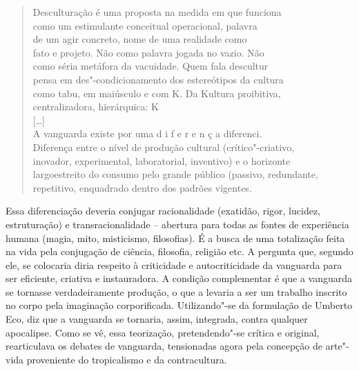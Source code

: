 \begin{quote}
Desculturação é uma proposta na medida em que \qb{}funciona\\
como um estimulante conceitual operacional, palavra\\
de um agir concreto, nome de uma realidade como\\
fato e projeto. Não como palavra jogada no vazio. Não\\
como séria metáfora da vacuidade. Quem fala \qb{}descultur\\
pensa em des"-condicionamento dos estereótipos da \qb{}cultura\\
como tabu, em maiúsculo e com K. Da Kultura \qb{}proibitiva,\\
centralizadora, hierárquica: K\\
{[}\ldots{}{]}\\
A vanguarda existe por uma d i f e r e n ç a \qb{}diferenci.\\
Diferença entre o nível de produção cultural \qb{}(crítico"-criativo,\\
inovador, experimental, laboratorial, inventivo) e o \qb{}horizonte\\
largoestreito do consumo pelo grande público (passivo, \qb{}redundante,\\
repetitivo, enquadrado dentro dos padrões vigentes.
\end{quote}

Essa diferenciação deveria conjugar racionalidade (exatidão, rigor,
lucidez, estruturação) e transracionalidade -- abertura para todas as
fontes de experiência humana (magia, mito, misticismo, filosofias). É a
busca de uma totalização feita na vida pela conjugação de ciência,
filosofia, religião etc. A pergunta que, segundo ele, se colocaria diria
respeito à criticidade e autocriticidade da vanguarda para ser
eficiente, criativa e instauradora. A condição complementar é que a
vanguarda se tornasse verdadeiramente produção, o que a levaria a ser um
trabalho inscrito no corpo pela imaginação corporificada. Utilizando"-se
da formulação de Umberto Eco, diz que a vanguarda se tornaria, assim,
integrada, contra qualquer apocalipse. Como se vê, essa teorização,
pretendendo"-se crítica e original, rearticulava os debates de
vanguarda, tensionadas agora pela concepção de arte"-vida proveniente do
tropicalismo e da contracultura.

